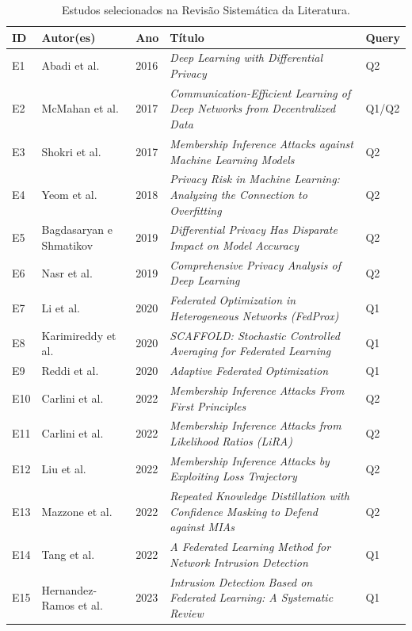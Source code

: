 \documentclass[
	12pt,				%
	openright,			%
	oneside,			%
	a4paper,			%
	english,			%
	french,				%
	spanish,			%
	brazil,				%
	]{abntex2}
\begin{document}
\begin{table}[H]
\centering
\scriptsize
\caption{Estudos selecionados na Revisão Sistemática da Literatura.}
\label{tab:estudos_selecionados}
\renewcommand{\arraystretch}{1.2}
\begin{tabular}{p{0.4cm}p{3.0cm}p{0.6cm}p{7.5cm}p{1.2cm}}
\toprule
\textbf{ID} & \textbf{Autor(es)} & \textbf{Ano} & \textbf{Título} & \textbf{Query} \\
\midrule
E1 & Abadi et al. & 2016 & \textit{Deep Learning with Differential Privacy} & Q2 \\
E2 & McMahan et al. & 2017 & \textit{Communication-Efficient Learning of Deep Networks from Decentralized Data} & Q1/Q2 \\
E3 & Shokri et al. & 2017 & \textit{Membership Inference Attacks against Machine Learning Models} & Q2 \\
E4 & Yeom et al. & 2018 & \textit{Privacy Risk in Machine Learning: Analyzing the Connection to Overfitting} & Q2 \\
E5 & Bagdasaryan e Shmatikov & 2019 & \textit{Differential Privacy Has Disparate Impact on Model Accuracy} & Q2 \\
E6 & Nasr et al. & 2019 & \textit{Comprehensive Privacy Analysis of Deep Learning} & Q2 \\
E7 & Li et al. & 2020 & \textit{Federated Optimization in Heterogeneous Networks (FedProx)} & Q1 \\
E8 & Karimireddy et al. & 2020 & \textit{SCAFFOLD: Stochastic Controlled Averaging for Federated Learning} & Q1 \\
E9 & Reddi et al. & 2020 & \textit{Adaptive Federated Optimization} & Q1 \\
E10 & Carlini et al. & 2022 & \textit{Membership Inference Attacks From First Principles} & Q2 \\
E11 & Carlini et al. & 2022 & \textit{Membership Inference Attacks from Likelihood Ratios (LiRA)} & Q2 \\
E12 & Liu et al. & 2022 & \textit{Membership Inference Attacks by Exploiting Loss Trajectory} & Q2 \\
E13 & Mazzone et al. & 2022 & \textit{Repeated Knowledge Distillation with Confidence Masking to Defend against MIAs} & Q2 \\
E14 & Tang et al. & 2022 & \textit{A Federated Learning Method for Network Intrusion Detection} & Q1 \\
E15 & Hernandez-Ramos et al. & 2023 & \textit{Intrusion Detection Based on Federated Learning: A Systematic Review} & Q1 \\

\end{tabular}
\end{table}
\end{document}
